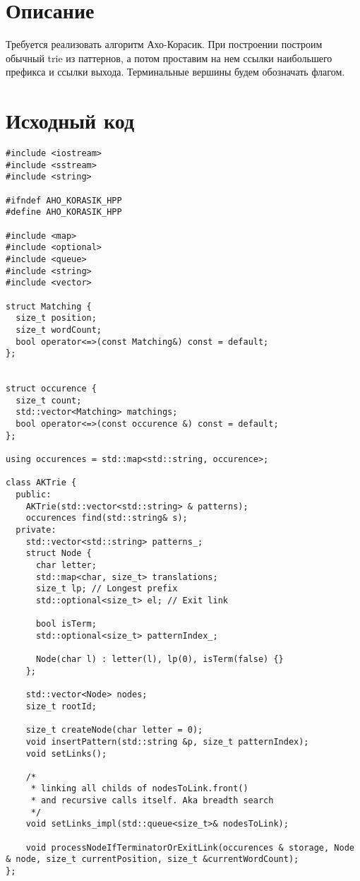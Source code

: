 \section{Описание}
Требуется реализовать алгоритм Ахо-Корасик. При построении построим обычный trie из паттернов, а потом проставим на нем ссылки наибольшего префикса и ссылки выхода. Терминальные вершины будем обозначать флагом.

\pagebreak

\section{Исходный код}

\begin{verbatim}
#include <iostream>
#include <sstream>
#include <string>

#ifndef AHO_KORASIK_HPP
#define AHO_KORASIK_HPP

#include <map>
#include <optional>
#include <queue>
#include <string>
#include <vector>

struct Matching {
  size_t position;
  size_t wordCount;
  bool operator<=>(const Matching&) const = default;
};


struct occurence {
  size_t count;
  std::vector<Matching> matchings;
  bool operator<=>(const occurence &) const = default;
};

using occurences = std::map<std::string, occurence>; 

class AKTrie {
  public:
    AKTrie(std::vector<std::string> & patterns);
    occurences find(std::string& s);
  private:
    std::vector<std::string> patterns_;
    struct Node {
      char letter;
      std::map<char, size_t> translations;
      size_t lp; // Longest prefix
      std::optional<size_t> el; // Exit link
                                
      bool isTerm;
      std::optional<size_t> patternIndex_;

      Node(char l) : letter(l), lp(0), isTerm(false) {}
    };

    std::vector<Node> nodes;
    size_t rootId;

    size_t createNode(char letter = 0);
    void insertPattern(std::string &p, size_t patternIndex);
    void setLinks();

    /* 
     * linking all childs of nodesToLink.front()
     * and recursive calls itself. Aka breadth search 
     */
    void setLinks_impl(std::queue<size_t>& nodesToLink); 

    void processNodeIfTerminatorOrExitLink(occurences & storage, Node & node, size_t currentPosition, size_t &currentWordCount);
};


\end{verbatim}
